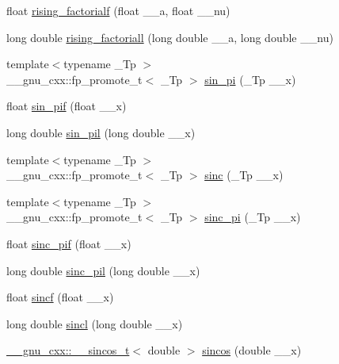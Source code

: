 \begin{DoxyCompactItemize}
float \hyperlink{group__gnu__math__spec__func_ga10da05b995a42f0b0625e61186af7449}{rising\+\_\+factorialf} (float \+\_\+\+\_\+a, float \+\_\+\+\_\+nu)
\item 
long double \hyperlink{group__gnu__math__spec__func_gac9a399ae01c315aa78a64b445795d974}{rising\+\_\+factoriall} (long double \+\_\+\+\_\+a, long double \+\_\+\+\_\+nu)
\item 
{\footnotesize template$<$typename \+\_\+\+Tp $>$ }\\\+\_\+\+\_\+gnu\+\_\+cxx\+::fp\+\_\+promote\+\_\+t$<$ \+\_\+\+Tp $>$ \hyperlink{group__gnu__math__spec__func_ga220f8a9a0477697cff96e84dc911d5f0}{sin\+\_\+pi} (\+\_\+\+Tp \+\_\+\+\_\+x)
\item 
float \hyperlink{group__gnu__math__spec__func_ga74fc8e2dd770850e7ea8bf8a28a71777}{sin\+\_\+pif} (float \+\_\+\+\_\+x)
\item 
long double \hyperlink{group__gnu__math__spec__func_ga0bda860961b0a121e266b278f260634b}{sin\+\_\+pil} (long double \+\_\+\+\_\+x)
\item 
{\footnotesize template$<$typename \+\_\+\+Tp $>$ }\\\+\_\+\+\_\+gnu\+\_\+cxx\+::fp\+\_\+promote\+\_\+t$<$ \+\_\+\+Tp $>$ \hyperlink{group__gnu__math__spec__func_ga09976b5d041113979c93613cc3700348}{sinc} (\+\_\+\+Tp \+\_\+\+\_\+x)
\item 
{\footnotesize template$<$typename \+\_\+\+Tp $>$ }\\\+\_\+\+\_\+gnu\+\_\+cxx\+::fp\+\_\+promote\+\_\+t$<$ \+\_\+\+Tp $>$ \hyperlink{group__gnu__math__spec__func_ga5195270024403b985e7d4f2f935f8779}{sinc\+\_\+pi} (\+\_\+\+Tp \+\_\+\+\_\+x)
\item 
float \hyperlink{group__gnu__math__spec__func_gad92d43d5332c80d1a27c90bfe3f6417e}{sinc\+\_\+pif} (float \+\_\+\+\_\+x)
\item 
long double \hyperlink{group__gnu__math__spec__func_gaad38a6e40b1272391a26dbb32a684b3c}{sinc\+\_\+pil} (long double \+\_\+\+\_\+x)
\item 
float \hyperlink{group__gnu__math__spec__func_gaa87f0734cfe7823c932511ac2f0a876c}{sincf} (float \+\_\+\+\_\+x)
\item 
long double \hyperlink{group__gnu__math__spec__func_ga79a8fd931f5ad4f737e2931e636149ac}{sincl} (long double \+\_\+\+\_\+x)
\item 
\hyperlink{struct____gnu__cxx_1_1____sincos__t}{\+\_\+\+\_\+gnu\+\_\+cxx\+::\+\_\+\+\_\+sincos\+\_\+t}$<$ double $>$ \hyperlink{group__gnu__math__spec__func_ga8041c24b528475bcf8a4178e484652a3}{sincos} (double \+\_\+\+\_\+x)

\end{DoxyCompactItemize}
